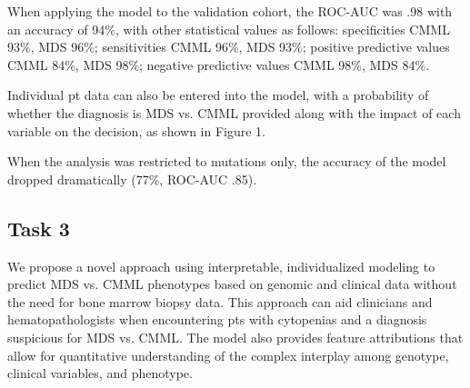 When applying the model to the validation cohort, the ROC-AUC was .98 with an accuracy of 94\%, with other statistical values as follows: specificities CMML 93\%, MDS 96\%; sensitivities CMML 96\%, MDS 93\%; positive predictive values CMML 84\%, MDS 98\%; negative predictive values CMML 98\%, MDS 84\%.

Individual pt data can also be entered into the model, with a probability of whether the diagnosis is MDS vs. CMML provided along with the impact of each variable on the decision, as shown in Figure 1.

When the analysis was restricted to mutations only, the accuracy of the model dropped dramatically (77\%, ROC-AUC .85).


\subsection{Task 3}%

We propose a novel approach using interpretable, individualized modeling to predict MDS vs. CMML phenotypes based on genomic and clinical data without the need for bone marrow biopsy data. This approach can aid clinicians and hematopathologists when encountering pts with cytopenias and a diagnosis suspicious for MDS vs. CMML. The model also provides feature attributions that allow for quantitative understanding of the complex interplay among genotype, clinical variables, and phenotype.


